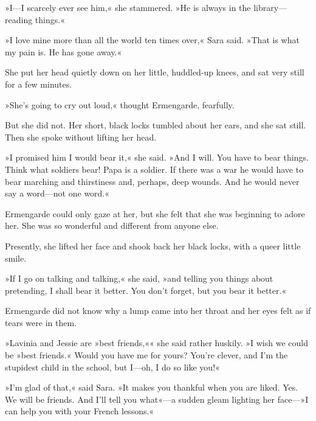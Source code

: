»I—I scarcely ever see him,« she stammered. »He is always in the library—reading things.«

»I love mine more than all the world ten times over,« Sara said. »That is what my pain is. He has gone away.«

She put her head quietly down on her little, huddled-up knees, and sat very still for a few minutes.

»She's going to cry out loud,« thought Ermengarde, fearfully.

But she did not. Her short, black locks tumbled about her ears, and she sat still. Then she spoke without lifting her head.

»I promised him I would bear it,« she said. »And I will. You have to bear things. Think what soldiers bear! Papa is a soldier. If there was a war he would have to bear marching and thirstiness and, perhaps, deep wounds. And he would never say a word—not one word.«

Ermengarde could only gaze at her, but she felt that she was beginning to adore her. She was so wonderful and different from anyone else.

Presently, she lifted her face and shook back her black locks, with a queer little smile.

»If I go on talking and talking,« she said, »and telling you things about pretending, I shall bear it better. You don't forget, but you bear it better.«

Ermengarde did not know why a lump came into her throat and her eyes felt as if tears were in them.

»Lavinia and Jessie are »best friends,«« she said rather huskily. »I wish we could be »best friends.« Would you have me for yours? You're clever, and I'm the stupidest child in the school, but I—oh, I do so like you!«

»I'm glad of that,« said Sara. »It makes you thankful when you are liked. Yes. We will be friends. And I'll tell you what«—a sudden gleam lighting her face—»I can help you with your French lessons.«


